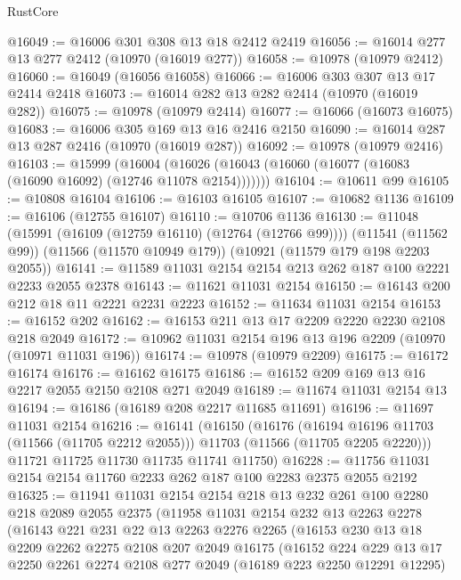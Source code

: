 \begin{lexlean}{RustCore}
\begin{coremodule}
@16049 := @16006 @301 @308 @13 @18 @2412 @2419
@16056 := @16014 @277 @13 @277 @2412 (@10970 (@16019 @277))
@16058 := @10978 (@10979 @2412)
@16060 := @16049 (@16056 @16058)
@16066 := @16006 @303 @307 @13 @17 @2414 @2418
@16073 := @16014 @282 @13 @282 @2414 (@10970 (@16019 @282))
@16075 := @10978 (@10979 @2414)
@16077 := @16066 (@16073 @16075)
@16083 := @16006 @305 @169 @13 @16 @2416 @2150
@16090 := @16014 @287 @13 @287 @2416 (@10970 (@16019 @287))
@16092 := @10978 (@10979 @2416)
@16103 := @15999
    (@16004 (@16026 (@16043 (@16060 (@16077 (@16083 (@16090 @16092) (@12746 @11078 @2154)))))))
@16104 := @10611 @99
@16105 := @10808 @16104
@16106 := @16103 @16105
@16107 := @10682 @1136
@16109 := @16106 (@12755 @16107)
@16110 := @10706 @1136
@16130 := @11048
    (@15991 (@16109 (@12759 @16110) (@12764 (@12766 @99))))
    (@11541 (@11562 @99))
    (@11566 (@11570 @10949 @179))
    (@10921 (@11579 @179 @198 @2203 @2055))
@16141 := @11589 @11031 @2154 @2154 @213 @262 @187 @100 @2221 @2233 @2055 @2378
@16143 := @11621 @11031 @2154
@16150 := @16143 @200 @212 @18 @11 @2221 @2231 @2223
@16152 := @11634 @11031 @2154
@16153 := @16152 @202
@16162 := @16153 @211 @13 @17 @2209 @2220 @2230 @2108 @218 @2049
@16172 := @10962 @11031 @2154 @196 @13 @196 @2209 (@10970 (@10971 @11031 @196))
@16174 := @10978 (@10979 @2209)
@16175 := @16172 @16174
@16176 := @16162 @16175
@16186 := @16152 @209 @169 @13 @16 @2217 @2055 @2150 @2108 @271 @2049
@16189 := @11674 @11031 @2154 @13
@16194 := @16186 (@16189 @208 @2217 @11685 @11691)
@16196 := @11697 @11031 @2154
@16216 := @16141
    (@16150
      (@16176
        (@16194 @16196 @11703 (@11566 (@11705 @2212 @2055)))
        @11703
        (@11566 (@11705 @2205 @2220)))
      @11721
      @11725
      @11730
      @11735
      @11741
      @11750)
@16228 := @11756 @11031 @2154 @2154 @11760 @2233 @262 @187 @100 @2283 @2375 @2055 @2192
@16325 := @11941
    @11031
    @2154
    @2154
    @218
    @13
    @232
    @261
    @100
    @2280
    @218
    @2089
    @2055
    @2375
    (@11958
      @11031
      @2154
      @232
      @13
      @2263
      @2278
      (@16143
        @221
        @231
        @22
        @13
        @2263
        @2276
        @2265
        (@16153
          @230
          @13
          @18
          @2209
          @2262
          @2275
          @2108
          @207
          @2049
          @16175
          (@16152
            @224
            @229
            @13
            @17
            @2250
            @2261
            @2274
            @2108
            @277
            @2049
            (@16189 @223 @2250 @12291 @12295)

\end{coremodule}
\end{lexlean}
